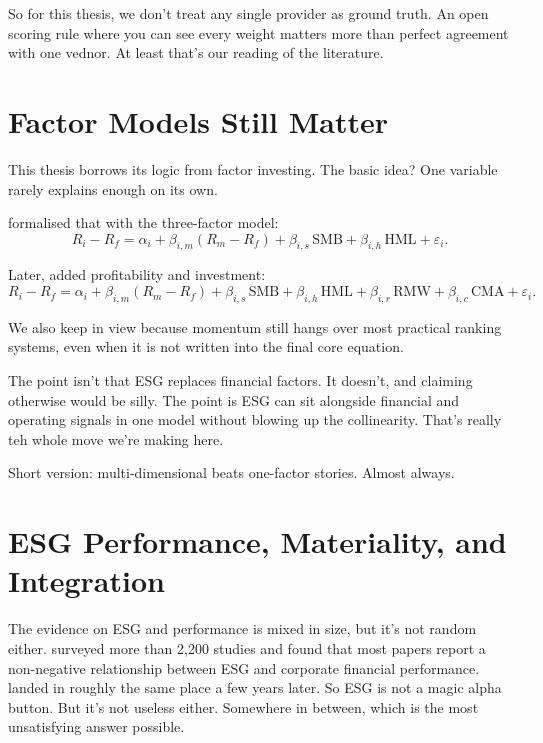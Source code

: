 So for this thesis, we don't treat any single provider as ground truth. An open scoring rule where you can see every weight matters more than perfect agreement with one vednor. At least that's our reading of the literature.

\section{Factor Models Still Matter}
\label{sec:lit_factors}

This thesis borrows its logic from factor investing. The basic idea? One variable rarely explains enough on its own.

\textcite{fama_french_1993} formalised that with the three-factor model:
\begin{equation}
R_i - R_f = \alpha_i + \beta_{i,m}(R_m - R_f) + \beta_{i,s}\,\text{SMB} + \beta_{i,h}\,\text{HML} + \varepsilon_i.
\label{eq:ff3}
\end{equation}

Later, \textcite{fama_french_2015} added profitability and investment:
\begin{equation}
R_i - R_f = \alpha_i + \beta_{i,m}(R_m - R_f) + \beta_{i,s}\,\text{SMB} + \beta_{i,h}\,\text{HML} + \beta_{i,r}\,\text{RMW} + \beta_{i,c}\,\text{CMA} + \varepsilon_i.
\label{eq:ff5}
\end{equation}

We also keep \textcite{carhart_1997} in view because momentum still hangs over most practical ranking systems, even when it is not written into the final core equation.

The point isn't that ESG replaces financial factors. It doesn't, and claiming otherwise would be silly. The point is ESG can sit alongside financial and operating signals in one model without blowing up the collinearity. That's really teh whole move we're making here.

Short version: multi-dimensional beats one-factor stories. Almost always.

\section{ESG Performance, Materiality, and Integration}
\label{sec:lit_esg_performance_integration}

The evidence on ESG and performance is mixed in size, but it's not random either. \textcite{friede_2015} surveyed more than 2{,}200 studies and found that most papers report a non-negative relationship between ESG and corporate financial performance. \textcite{atz_2023} landed in roughly the same place a few years later. So ESG is not a magic alpha button. But it's not useless either. Somewhere in between, which is the most unsatisfying answer possible.

